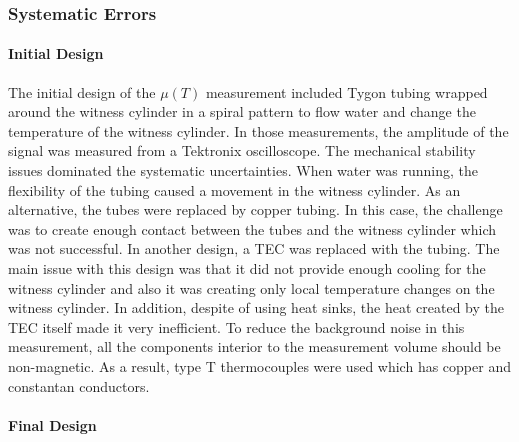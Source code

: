 \subsubsection{Systematic Errors}

\paragraph{Initial Design}

The initial design of the $\mu(T)$ measurement included Tygon tubing
wrapped around the witness cylinder in a spiral pattern to flow water
and change the temperature of the witness cylinder. In those
measurements, the amplitude of the signal was measured from a
Tektronix oscilloscope. The mechanical stability issues dominated the
systematic uncertainties. When water was running, the flexibility of
the tubing caused a movement in the witness cylinder. As an
alternative, the tubes were replaced by copper tubing. In this case,
the challenge was to create enough contact between the tubes and the
witness cylinder which was not successful. In another design, a TEC
was replaced with the tubing. The main issue with this design was that
it did not provide enough cooling for the witness cylinder and also it
was creating only local temperature changes on the witness
cylinder. In addition, despite of using heat sinks, the heat created
by the TEC itself made it very inefficient. To reduce the background
noise in this measurement, all the components interior to the
measurement volume should be non-magnetic. As a result, type T
thermocouples were used which has copper and constantan conductors.



\paragraph{Final Design} 

